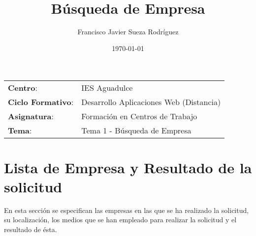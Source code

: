 


\title{
\vspace{10ex}
\normalfont \normalsize
\huge \textbf{Búsqueda de Empresa}
}
\author{Francisco Javier Sueza Rodríguez}
\date{\normalsize\today}




\maketitle

\thispagestyle{empty}

\vspace{65ex}

\begin{center}
    \begin{tabular}{l l}
        \textbf{Centro}: & IES Aguadulce \\
        \textbf{Ciclo Formativo}: & Desarrollo Aplicaciones Web (Distancia)\\
        \textbf{Asignatura}: & Formación en Centros de Trabajo\\
        \textbf{Tema}: & Tema 1 - Búsqueda de Empresa\\
    \end{tabular}
\end{center}

\newpage

\tableofcontents

\newpage

\section{Lista de Empresa y Resultado de la solicitud}
En esta sección se especifican las empresas en las que se ha realizado la solicitud, su localización, los medios que se han empleado para realizar la solicitud y el resultado de ésta.


